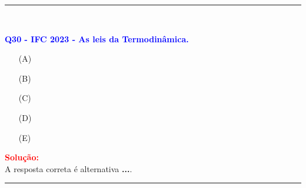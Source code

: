 \documentclass[a4paper,12pt]{article}
\newcommand{\printingbibliography}{%

    \pagestyle{myheadings}
    \markright{}
    \sloppy
    \printbibliography[heading=bibintoc, %
                   title=Refer\^encias %
                  ]
    \fussy%
}
\begin{document}
\noindent\rule{\linewidth}{0.6pt}\\

\begin{flushleft}
\textbf{\textcolor{blue}{\Large Q30 - IFC 2023 - As leis da Termodinâmica.}}\\
\noindent

\begin{itemize}
\item[(A)] 
\item[(B)] 
\item[(C)] 
\item[(D)] 
\item[(E)] 
\end{itemize}

\vspace{0.5cm}

\textcolor{red}{\textbf{Solução:}}\\


A resposta correta é alternativa \colorbox{green!50}{\textbf{...}}.
\end{flushleft}

\noindent\rule{\linewidth}{0.6pt}\\


\end{document}
